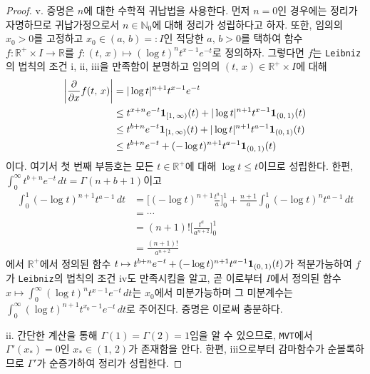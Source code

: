 \begin{proof}
    v. 증명은 $n$에 대한 수학적 귀납법을 사용한다. 먼저 $n=0$인 경우에는 정리가 자명하므로 귀납가정으로서 $n\in\mathbb{N}_0$에 대해 정리가 성립하다고 하자. 또한, 임의의 $x_0>0$를 고정하고 $x_0\in(a,\,b)=:I$인 적당한 $a,\,b>0$를 택하여 함수 $f:\mathbb{R}^+\times I\to\mathbb{R}$를 $f:(t,\,x)\mapsto (\log t)^nt^{x-1}e^{-t}$로 정의하자. 그렇다면 $f$는 \texttt{Leibniz}의 법칙의 조건 i, ii, iii을 만족함이 분명하고 임의의 $(t,\,x)\in\mathbb{R}^+\times I$에 대해
    \begin{align*}
        \bigg|\frac{\partial}{\partial x}f(t,\,x)\bigg|&=|\log t|^{n+1}t^{x-1}e^{-t}\\
        &\leq t^{x+n}e^{-t}\mathbf{1}_{[1,\,\infty)}(t)+|\log t|^{n+1}t^{x-1}\mathbf{1}_{(0,\,1)}(t)\\
        &\leq t^{b+n}e^{-t}\mathbf{1}_{[1,\,\infty)}(t)+|\log t|^{n+1}t^{a-1}\mathbf{1}_{(0,\,1)}(t)\\
        &\leq t^{b+n}e^{-t}+(-\log t)^{n+1}t^{a-1}\mathbf{1}_{(0,\,1)}(t)
    \end{align*}
    이다. 여기서 첫 번째 부등호는 모든 $t\in\mathbb{R}^+$에 대해 $\log t\leq t$이므로 성립한다. 한편, $\int_0^\infty t^{b+n}e^{-t}\,dt=\Gamma(n+b+1)$이고
    \begin{align*}
        \int_0^1(-\log t)^{n+1}t^{a-1}\,dt&=\bigg[(-\log t)^{n+1}\frac{t^a}{a}\bigg]_0^1+\frac{n+1}{a}\int_0^1(-\log t)^nt^{a-1}\,dt\\
        &=\cdots\\
        &=(n+1)!\bigg[\frac{t^a}{a^{n+2}}\bigg]_0^1\\
        &=\frac{(n+1)!}{a^{n+2}}
    \end{align*}
    에서 $\mathbb{R}^+$에서 정의된 함수 $t\mapsto t^{b+n}e^{-t}+(-\log t)^{n+1}t^{a-1}\mathbf{1}_{(0,\,1)}(t)$가 적분가능하여 $f$가 \texttt{Leibniz}의 법칙의 조건 iv도 만족시킴을 알고, 곧 이로부터 $I$에서 정의된 함수 $x\mapsto\int_0^\infty (\log t)^nt^{x-1}e^{-t}\,dt$는 $x_0$에서 미분가능하며 그 미분계수는 $\int_0^\infty (\log t)^{n+1}t^{x_0-1}e^{-t}\,dt$로 주어진다. 증명은 이로써 충분하다.

    ii. 간단한 계산을 통해 $\Gamma(1)=\Gamma(2)=1$임을 알 수 있으므로, \texttt{MVT}에서 $\Gamma'(x_*)=0$인 $x_*\in(1,\,2)$가 존재함을 안다. 한편, iii으로부터 감마함수가 순볼록하므로 $\Gamma'$가 순증가하여 정리가 성립한다.
\end{proof}

